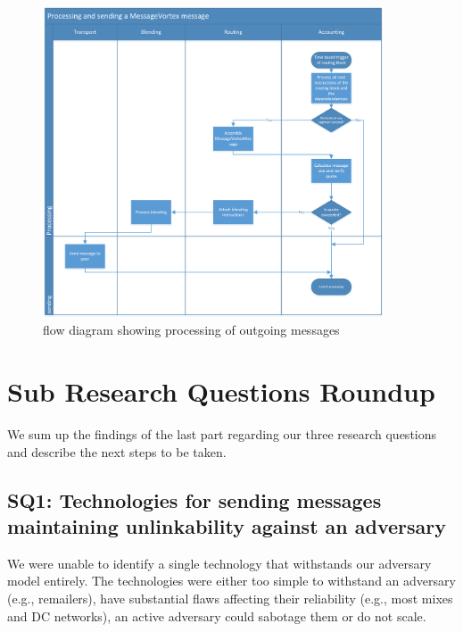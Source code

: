 \begin{figure}[hbt]
	\includegraphics[width=0.90\textwidth]{inc/flowchart_message_sending}
	\caption{flow diagram showing processing of outgoing messages}
	\label{fig:msgSendProcessing}
\end{figure}

\section{Sub Research Questions Roundup}
We sum up the findings of the last part regarding our three research questions and describe the next steps to be taken.

\subsection{SQ1: Technologies for sending messages maintaining unlinkability against an adversary}
We were unable to identify a single technology that withstands our adversary model entirely. The technologies were either too simple to withstand an adversary (e.g., remailers), have substantial flaws affecting their reliability (e.g., most mixes and DC networks), an active adversary could sabotage them or do not scale.

